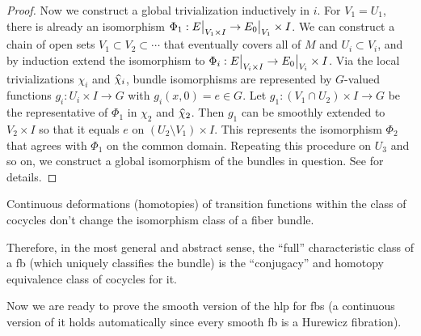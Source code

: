 \begin{proof}
    Now we construct a global trivialization inductively in $i$. For $V_1=U_1$, there is already an isomorphism $\Phi_1:\restr{E}{V_1\times I}\to\restr{E_0}{V_1}\times I$. We can construct a chain of open sets $V_1\subset V_2\subset\cdots$ that eventually covers all of $M$ and $U_i\subset V_i$, and by induction extend the isomorphism to $\Phi_i:\restr{E}{V_i\times I}\to\restr{E_0}{V_i}\times I$. Via the local trivializations $\chi_i$ and $\wh{\chi}_i$, bundle isomorphisms are represented by $G$-valued functions $g_i:U_{i}\times I\to G$ with $g_i(x,0)=e\in G$. Let $g_1:(V_1\cap U_2)\times I\to G$ be the representative of $\Phi_1$ in $\chi_2$ and $\wh{\chi}_2$. Then $g_1$ can be smoothly extended to $V_2\times I$ so that it equals $e$ on $(U_2\setminus V_1)\times I$. This represents the isomorphism $\Phi_2$ that agrees with $\Phi_1$ on the common domain. Repeating this procedure on $U_3$ and so on, we construct a global isomorphism of the bundles in question. See \cite[Thm.~3.3.1]{RS2} for details.
\end{proof}

\begin{cor}
    Continuous deformations (homotopies) of transition functions within the class of cocycles don't change the isomorphism class of a fiber bundle.
\end{cor}



Therefore, in the most general and abstract sense, the ``full'' characteristic class of a \gls{fb} (which uniquely classifies the bundle) is the ``conjugacy'' and homotopy equivalence class of cocycles for it.

Now we are ready to prove the smooth version of the \gls{hlp} for \glspl{fb} (a continuous version of it holds automatically since every smooth \gls{fb} is a Hurewicz fibration).

